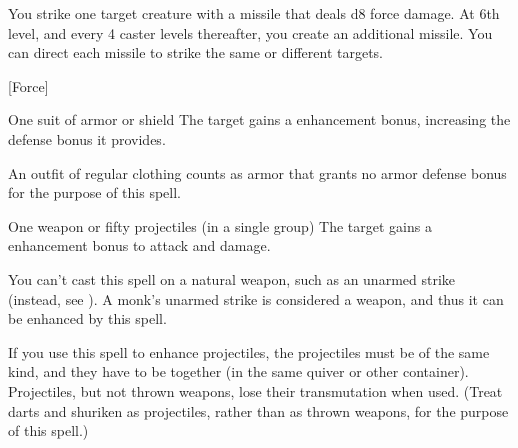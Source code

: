 \begin{spellheader}
\end{spellheader}
\begin{spelleffects}
    \spelleffect You strike one target creature with a missile that deals d8 force damage. At 6th level, and every 4 caster levels thereafter, you create an additional missile. You can direct each missile to strike the same or different targets.
\end{spelleffects}
\begin{spellfooter}
    [Force] \forcespellnotes
\end{spellfooter}

\begin{spellheader}
    \spellrng{\rngclose}
    \spelldur{\durmed}
\end{spellheader}
\begin{spelleffects}
    \begin{spelltarget}{One suit of armor or shield}
        \spelleffect The target gains a  enhancement bonus, increasing the defense bonus it provides. \spellbonusscalingdescription
    \end{spelltarget}
\end{spelleffects}
\begin{spellfooter}
    \spellnotes An outfit of regular clothing counts as armor that grants no armor defense bonus for the purpose of this spell.
\end{spellfooter}

\begin{spellheader}
    \spellrng{\rngclose}
    \spelldur{\durshort}
\end{spellheader}
\begin{spelleffects}
    \begin{spelltarget}{One weapon or fifty projectiles (in a single group)}
        \spelleffect The target gains a  enhancement bonus to attack and damage. \spellbonusscalingdescription
    \end{spelltarget}
\end{spelleffects}
\begin{spellfooter}
    \spellnotes You can't cast this spell on a natural weapon, such as an unarmed strike (instead, see ). A monk's unarmed strike is considered a weapon, and thus it can be enhanced by this spell.
    \par If you use this spell to enhance projectiles, the projectiles must be of the same kind, and they have to be together (in the same quiver or other container). Projectiles, but not thrown weapons, lose their transmutation when used. (Treat darts and shuriken as projectiles, rather than as thrown weapons, for the purpose of this spell.)
\end{spellfooter}


